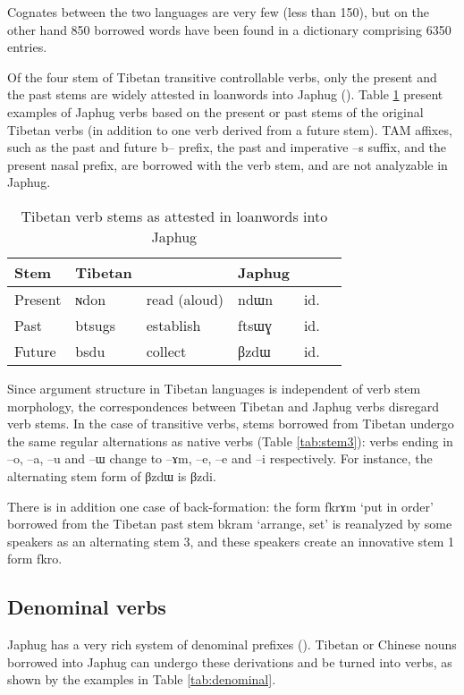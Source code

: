 \documentclass[oldfontcommands,oneside,a4paper,11pt]{article}
\newcommand{\ipa}[1]{{\phon \mbox{#1}}} %
\begin{document}
Cognates between the two languages are very few (less than 150), but on the other hand 850 borrowed words have been found in a dictionary comprising 6350 entries.


Of the four stem of Tibetan transitive controllable verbs, only the present and the past stems are widely attested in loanwords into Japhug (\citealt[138]{jacques04these}). Table  \ref{tab:four.stems} present examples of Japhug verbs based on the present or past stems of the original Tibetan verbs (in addition to one verb derived from a future stem). TAM affixes, such as the past and future \ipa{b--} prefix, the past and imperative \ipa{--s} suffix, and the present nasal prefix, are borrowed with the verb stem, and are not analyzable in Japhug.

 \begin{table} 
\caption{Tibetan verb stems as attested in loanwords into Japhug} \label{tab:four.stems} \centering
\begin{tabular}{llllll}
\toprule
Stem&Tibetan && Japhug &\\
\midrule
Present & \ipa{ɴdon} & read (aloud) & \ipa{ndɯn} &id.&\\
Past  & \ipa{btsugs} & establish & \ipa{ftsɯɣ} &id.&\\
Future & \ipa{bsdu} & collect & \ipa{βzdɯ} & id.\\
\bottomrule
\end{tabular}
\end{table}

Since argument structure in Tibetan languages is independent of verb stem morphology, the correspondences between Tibetan and Japhug verbs disregard verb stems. In the case of transitive verbs, stems borrowed from Tibetan undergo the same regular alternations  as native verbs (Table \ref{tab:stem3}): verbs ending in \ipa{--o}, \ipa{--a}, \ipa{--u} and \ipa{--ɯ} change to \ipa{--ɤm}, \ipa{--e}, \ipa{--e} and \ipa{--i} respectively. For instance, the alternating stem form of \ipa{βzdɯ} is \ipa{βzdi}.

There is in addition one case of back-formation: the form \ipa{fkrɤm} `put in order' borrowed from the Tibetan past stem \ipa{bkram} `arrange, set' is reanalyzed by some speakers as an alternating stem 3, and these speakers create an innovative stem 1 form \ipa{fkro}.

 
\subsection{Denominal verbs}\label{sec:denominal}
Japhug has a very rich system of denominal prefixes (\citealt{jacques12incorp, jacques14antipassive}). Tibetan or Chinese nouns borrowed into Japhug can undergo these derivations and be turned into verbs, as shown by the examples in Table \ref{tab:denominal}.
\end{document}
